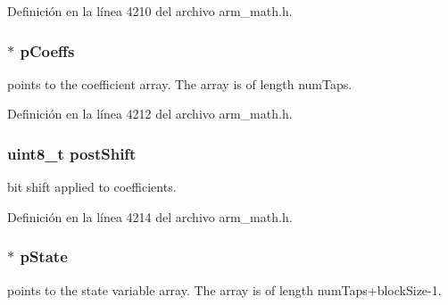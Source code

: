 Definición en la línea 4210 del archivo arm\+\_\+math.\+h.

\subsubsection[{\texorpdfstring{p\+Coeffs}{pCoeffs}}]{$\ast$ p\+Coeffs}\hypertarget{structarm__lms__norm__instance__q31_a68888e36167d81cb7836db10367a1682}{}\label{structarm__lms__norm__instance__q31_a68888e36167d81cb7836db10367a1682}
points to the coefficient array. The array is of length num\+Taps. 

Definición en la línea 4212 del archivo arm\+\_\+math.\+h.

\subsubsection[{\texorpdfstring{post\+Shift}{postShift}}]{\setlength{\rightskip}{0pt plus 5cm}uint8\+\_\+t post\+Shift}\hypertarget{structarm__lms__norm__instance__q31_a74050e9f36542bd56f4052381a82ae8f}{}\label{structarm__lms__norm__instance__q31_a74050e9f36542bd56f4052381a82ae8f}
bit shift applied to coefficients. 

Definición en la línea 4214 del archivo arm\+\_\+math.\+h.

\subsubsection[{\texorpdfstring{p\+State}{pState}}]{$\ast$ p\+State}\hypertarget{structarm__lms__norm__instance__q31_adee4ba3ee8869865af7d8fa08ca913d6}{}\label{structarm__lms__norm__instance__q31_adee4ba3ee8869865af7d8fa08ca913d6}
points to the state variable array. The array is of length num\+Taps+block\+Size-\/1. 

